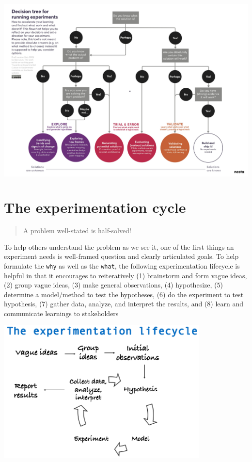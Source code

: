 \documentclass[openany]{book}
\begin{document}
\includegraphics{fig/decision_tree.jpeg}

\hypertarget{the-experimentation-cycle}{%
\section{The experimentation cycle}\label{the-experimentation-cycle}}

\begin{quote}
A problem well-stated is half-solved!
\end{quote}

To help others understand the problem as we see it, one of the first things an experiment needs is well-framed question and clearly articulated goals. To help formulate the \texttt{why} as well as the \texttt{what}, the following experimentation lifecycle is helpful in that it encourages to reiteratively (1) brainstorm and form vague ideas, (2) group vague ideas, (3) make general observations, (4) hypothesize, (5) determine a model/method to test the hypotheses, (6) do the experiment to test hypothesis, (7) gather data, analyze, and interpret the results, and (8) learn and communicate learnings to stakeholders

\includegraphics[width=0.8\textwidth,height=\textheight]{fig/experiment_lifecycle.png}
\end{document}
